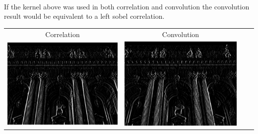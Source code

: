 \paragraph {}If the kernel above was used in both correlation and convolution the convolution result would be equivalent to a left sobel correlation.
\begin{table}[h!]
     \begin{center}
     \begin{tabular}{c c c c}
      Correlation & Convolution \\ 
     \includegraphics[scale=0.5]{right.jpg}
      & 
      \includegraphics[scale=0.5]{leftsobel.jpg}
      \end{tabular}
      \end{center}
      \end{table}




